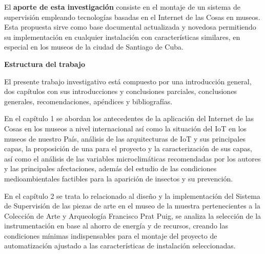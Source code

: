     El \textbf{aporte de esta investigación} consiste en el montaje de un sistema de supervisión empleando tecnologías basadas en el Internet de las Cosas en museos. Esta propuesta sirve como base documental actualizada y novedosa permitiendo su implementación en cualquier instalación con características similares, en especial en los museos de la ciudad de Santiago de Cuba.

    \textbf{Estructura del trabajo}

    El presente trabajo investigativo está compuesto por una introducción general, dos capítulos con sus introducciones y conclusiones parciales, conclusiones generales, recomendaciones, apéndices y bibliografías.

    En el capítulo 1 se abordan los antecedentes de la aplicación del Internet de las Cosas en los museos a nivel internacional así como la situación del IoT en los museos de nuestro País, análisis de las arquitecturas de IoT y sus principales capas, la proposición de una para el proyecto y la caracterización de sus capas, así como el análisis de las variables microclimáticas recomendadas por los autores y las principales afectaciones, además del estudio de las condiciones medioambientales factibles para la aparición de insectos y su prevención.

    En el capítulo 2 se trata lo relacionado al diseño y la implementación del Sistema de Supervisión de las piezas de arte en el museo de la muestra pertenecientes a la Colección de Arte y Arqueología Francisco Prat Puig, se analiza la selección de la instrumentación en base al ahorro de energía y de recursos, creando las condiciones mínimas indispensables para el montaje del proyecto de automatización ajustado a las características de instalación seleccionadas.
    